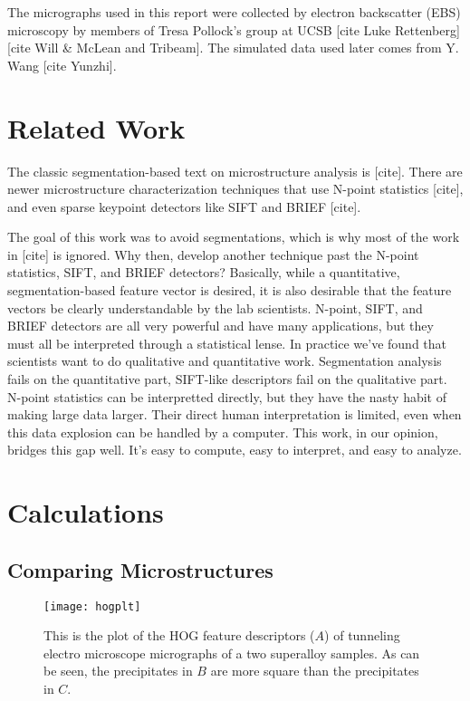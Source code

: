 \documentclass[review]{elsarticle}
\begin{document}
	The micrographs used in this report were collected by electron backscatter (EBS) microscopy by members of Tresa Pollock's group at UCSB [cite Luke Rettenberg] [cite Will \& McLean and Tribeam]. The simulated data used later comes from Y. Wang [cite Yunzhi].
	
	\section{Related Work}
	The classic segmentation-based text on microstructure analysis is [cite]. There are newer microstructure characterization techniques that use N-point statistics [cite], and even sparse keypoint detectors like SIFT and BRIEF [cite].
	
	The goal of this work was to avoid segmentations, which is why most of the work in [cite] is ignored. Why then, develop another technique past the N-point statistics, SIFT, and BRIEF detectors? Basically, while a quantitative, segmentation-based feature vector is desired, it is also desirable that the feature vectors be clearly understandable by the lab scientists. N-point, SIFT, and BRIEF detectors are all very powerful and have many applications, but they must all be interpreted through a statistical lense. In practice we've found that scientists want to do qualitative and quantitative work. Segmentation analysis fails on the quantitative part, SIFT-like descriptors fail on the qualitative part. N-point statistics can be interpretted directly, but they have the nasty habit of making large data larger. Their direct human interpretation is limited, even when this data explosion can be handled by a computer. This work, in our opinion, bridges this gap well. It's easy to compute, easy to interpret, and easy to analyze.

	\section{Calculations}
	\subsection{Comparing Microstructures}
	\begin{figure}[!ht]
  		\centering
    	\texttt{[image: hogplt]}
  		\caption{ This is the plot of the HOG feature descriptors ($A$) of tunneling electro microscope micrographs of a two superalloy samples. As can be seen, the precipitates in $B$ are more square than the precipitates in $C$. }
  		\label{figure2}
	\end{figure}
\end{document}
